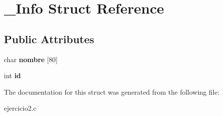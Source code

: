 \hypertarget{struct__Info}{}\section{\+\_\+\+Info Struct Reference}
\label{struct__Info}
\subsection*{Public Attributes}
\begin{DoxyCompactItemize}
\item 
char {\bfseries nombre} \mbox{[}80\mbox{]}\hypertarget{struct__Info_a89fea0009f6ad70c30ca21e681171093}{}\label{struct__Info_a89fea0009f6ad70c30ca21e681171093}

\item 
int {\bfseries id}\hypertarget{struct__Info_a6edb2741a028f19307e29d2c9c2aa2bf}{}\label{struct__Info_a6edb2741a028f19307e29d2c9c2aa2bf}

\end{DoxyCompactItemize}


The documentation for this struct was generated from the following file\+:\begin{DoxyCompactItemize}
\item 
ejercicio2.\+c\end{DoxyCompactItemize}
